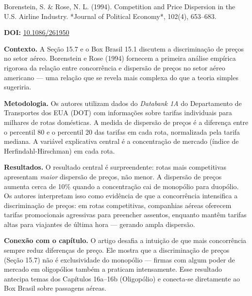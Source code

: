 \documentclass[11pt,twoside,openright]{book}
\begin{document}
\begin{pesquisabox}{Borenstein, S. & Rose, N. L. (1994). Competition and Price Dispersion in the U.S. Airline Industry. *Journal of Political Economy*, 102(4), 653–683.}

\textbf{DOI:} \href{https://doi.org/10.1086/261950}{10.1086/261950}

\textbf{Contexto.} A Seção 15.7 e o Box Brasil 15.1 discutem a
discriminação de preços no setor aéreo. Borenstein e Rose (1994)
fornecem a primeira análise empírica rigorosa da relação entre
concorrência e dispersão de preços no setor aéreo americano --- uma
relação que se revela mais complexa do que a teoria simples sugeriria.

\textbf{Metodologia.} Os autores utilizam dados do \emph{Databank 1A} do
Departamento de Transportes dos EUA (DOT) com informações sobre tarifas
individuais para milhares de rotas domésticas. A medida de dispersão de
preços é a diferença entre o percentil 80 e o percentil 20 das tarifas
em cada rota, normalizada pela tarifa mediana. A variável explicativa
central é a concentração de mercado (índice de Herfindahl-Hirschman) em
cada rota.

\textbf{Resultados.} O resultado central é surpreendente: rotas mais
competitivas apresentam \emph{maior} dispersão de preços, não menor. A
dispersão de preços aumenta cerca de 10\% quando a concentração cai de
monopólio para duopólio. Os autores interpretam isso como evidência de
que a concorrência intensifica a discriminação de preços: em rotas
competitivas, companhias aéreas oferecem tarifas promocionais agressivas
para preencher assentos, enquanto mantêm tarifas altas para viajantes de
última hora --- gerando ampla dispersão.

\textbf{Conexão com o capítulo.} O artigo desafia a intuição de que mais
concorrência sempre reduz diferenças de preço. Ele mostra que a
discriminação de preços (Seção 15.7) não é exclusividade do monopólio
--- firmas com algum poder de mercado em oligopólios também a praticam
intensamente. Esse resultado antecipa temas dos Capítulos 16a--16b
(Oligopólio) e conecta-se diretamente ao Box Brasil sobre passagens
aéreas.

\end{pesquisabox}
\end{document}
